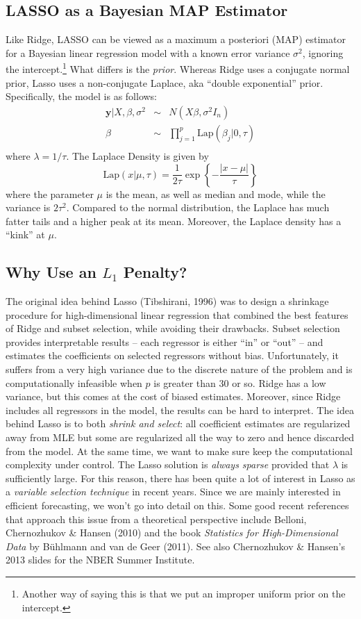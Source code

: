 \subsection{LASSO as a Bayesian MAP Estimator}
Like Ridge, LASSO can be viewed as a maximum a posteriori (MAP) estimator for a Bayesian linear regression model with a known error variance $\sigma^2$, ignoring the intercept.\footnote{Another way of saying this is that we put an improper uniform prior on the intercept.} What differs is the \emph{prior}. Whereas Ridge uses a conjugate normal prior, Lasso uses a non-conjugate Laplace, aka ``double exponential'' prior. Specifically, the model is as follows:
	\begin{eqnarray*}
		\mathbf{y}|X,\beta, \sigma^2 &\sim& N(X\beta,\sigma^2 I_n)\\
		\beta&\sim& \prod_{j=1}^p \mbox{Lap}(\beta_j|0, \tau)\\
	\end{eqnarray*}
where $\lambda = 1/\tau$. The Laplace Density is given by
	$$\mbox{Lap}(x|\mu,\tau)= \frac{1}{2\tau}\exp\left
	\{-\frac{|x-\mu|}{\tau} \right\}$$
where the parameter $\mu$ is the mean, as well as median and mode, while the variance is $2\tau^2$. Compared to the normal distribution, the Laplace has much fatter tails and a higher peak at its mean. Moreover, the Laplace density has a ``kink'' at $\mu$.


\subsection{Why Use an $L_1$ Penalty?}
The original idea behind Lasso (Tibshirani, 1996) was to design a shrinkage procedure for high-dimensional linear regression that combined the best features of Ridge and subset selection, while avoiding their drawbacks. Subset selection provides interpretable results -- each regressor is either ``in'' or ``out'' -- and estimates the coefficients on selected regressors without bias. Unfortunately, it suffers from a very high variance due to the discrete nature of the problem and is computationally infeasible when $p$ is greater than 30 or so. Ridge has a low variance, but this comes at the cost of biased estimates. Moreover, since Ridge includes all regressors in the model, the results can be hard to interpret. The idea behind Lasso is to both \emph{shrink and select}: all coefficient estimates are regularized away from MLE but some are regularized all the way to zero and hence discarded from the model. At the same time, we want to make sure keep the computational complexity under control. The Lasso solution is \emph{always sparse} provided that $\lambda$ is sufficiently large. For this reason, there has been quite a lot of interest in Lasso as a \emph{variable selection technique} in recent years. Since we are mainly interested in efficient forecasting, we won't go into detail on this. Some good recent references that approach this issue from a theoretical perspective include Belloni, Chernozhukov \& Hansen (2010) and the book \emph{Statistics for High-Dimensional Data} by B\"{u}hlmann and van de Geer (2011). See also Chernozhukov \& Hansen's 2013 slides for the NBER Summer Institute. 

